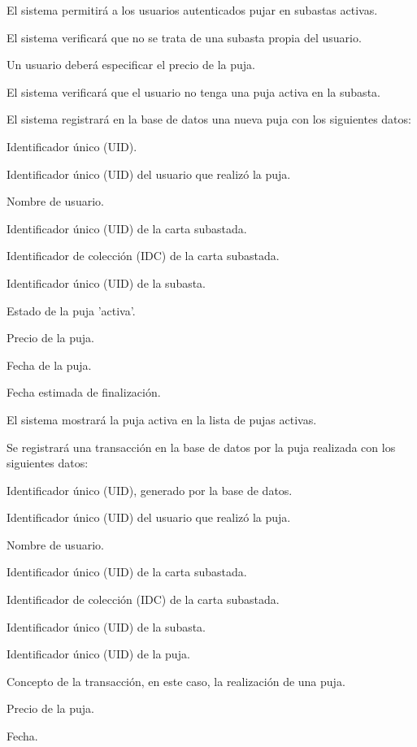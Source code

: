 \begin{RFSubastas}
\begin{RFSubastas}
\begin{RFSubastas}
	\end{RFSubastas}
		\item El sistema permitirá a los usuarios autenticados pujar en subastas activas.
		\begin{RFSubastas}
			\item El sistema verificará que no se trata de una subasta propia del usuario.
			\item Un usuario deberá especificar el precio de la puja.
			\item El sistema verificará que el usuario no tenga una puja activa en la subasta.
			\item El sistema registrará en la base de datos una nueva puja con los siguientes datos:
			\begin{RFSubastas}
				\item Identificador único (UID).
				\item Identificador único (UID) del usuario que realizó la puja.
				\item Nombre de usuario.
				\item Identificador único (UID) de la carta subastada.
				\item Identificador de colección (IDC) de la carta subastada.
				\item Identificador único (UID) de la subasta.
				\item Estado de la puja 'activa'.
				\item Precio de la puja.
				\item Fecha de la puja.
				\item Fecha estimada de finalización.
			\end{RFSubastas}
			\item El sistema mostrará la puja activa en la lista de pujas activas.
			\item Se registrará una transacción en la base de datos por la puja realizada con los siguientes datos:
			\begin{RFSubastas}
				\item Identificador único (UID), generado por la base de datos.
				\item Identificador único (UID) del usuario que realizó la puja.
				\item Nombre de usuario.
				\item Identificador único (UID) de la carta subastada.
				\item Identificador de colección (IDC) de la carta subastada.
				\item Identificador único (UID) de la subasta.
				\item Identificador único (UID) de la puja.
				\item Concepto de la transacción, en este caso, la realización de una puja.
				\item Precio de la puja.
				\item Fecha.
			\end{RFSubastas}
		\end{RFSubastas}
	\end{RFSubastas}


\end{RFSubastas}
